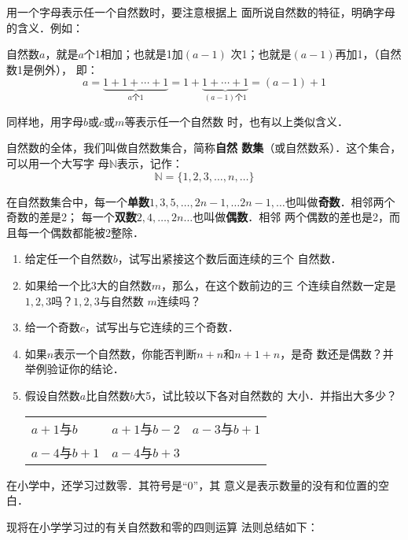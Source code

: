     用一个字母表示任一个自然数时，要注意根据上
    面所说自然数的特征，明确字母的含义．例如：

    自然数$a$，就是$a$个1相加；也就是1加$(a- 1)$
次1；也就是$(a-1)$再加1，（自然数1是例外），
即：
\[a=\underbrace{1+1+\cdots+1}_{a\text{个} 1}=1+\underbrace{1+\cdots+1}_{(a-1)\text{个} 1} = (a-1)+1\]

同样地，用字母$b$或$c$或$m$等表示任一个自然数
时，也有以上类似含义．

    自然数的全体，我们叫做自然数集合，简称\textbf{自然
数集}（或自然数系）．这个集合，可以用一个大写字
母$\mathbb{N}$表示，记作：
\[\mathbb{N}=\{1,2,3,\ldots,n,\ldots \} \]

在自然数集合中，每一个\textbf{单数}$1, 3, 5,\ldots, 2n-1,\ldots 2n-1,\ldots$也叫做\textbf{奇数}．相邻两个奇数的差是2；
每一个\textbf{双数}$2 ,  4 , \ldots,  2n\ldots$也叫做\textbf{偶数}．相邻
两个偶数的差也是2，而且每一个偶数都能被2整除．

\begin{ex}
\begin{enumerate}
    \item  给定任一个自然数$b$，试写出紧接这个数后面连续的三个
      自然数．
      \item  如果给一个比3大的自然数$m$，那么，在这个数前边的三
      个连续自然数一定是$1,  2,  3$吗？$1,  2,  3$与自然数
      $m$连续吗？
      \item  给一个奇数$c$，试写出与它连续的三个奇数．
      \item  如果$n$表示一个自然数，你能否判断$n+n$和$n+1+n$，是奇
      数还是偶数？并举例验证你的结论．
      \item 假设自然数$a$比自然数$b$大5，试比较以下各对自然数的
        大小．并指出大多少？
\begin{center}
    \begin{tabular}{lll}
    $a+1$与$b$&
    $a + 1$与$b-2$&
    $a-3$与$b + 1$\\
    $a-4$与$b+1$&
    $a-4$与$b+ 3$\\
\end{tabular}
\end{center}

    \end{enumerate}  
\end{ex}

在小学中，还学习过数零．其符号是“0”，其
意义是表示数量的没有和位置的空白．

    现将在小学学习过的有关自然数和零的四则运算
法则总结如下：


